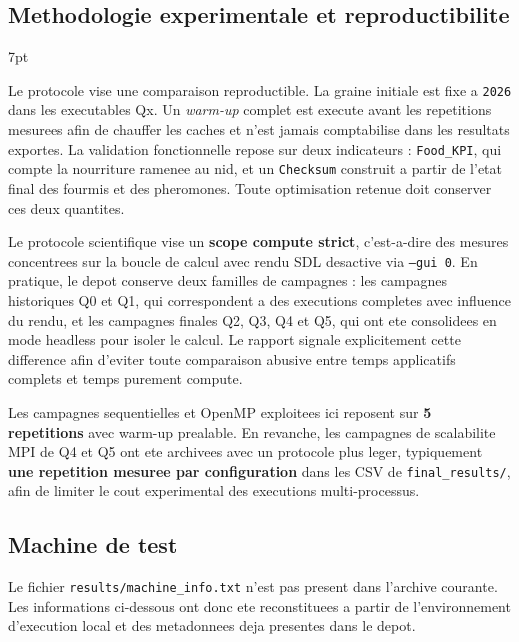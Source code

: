 \documentclass[11pt,a4paper]{article}
\newenvironment{formal}{%
\def\FrameCommand{%
  \hspace{1pt}%
  {\color{enstaBleuFonce}\vrule width 2pt}%
  {\color{formalshade}\vrule width 4pt}%
  \colorbox{formalshade}%
}%
\MakeFramed{\advance\hsize-\width\FrameRestore}%
\noindent\hspace{-4.55pt}%
\begin{adjustwidth}{}{7pt}%
\vspace{4pt}%
}{%
\vspace{4pt}\end{adjustwidth}\endMakeFramed%
}
\begin{document}
\subsection{Methodologie experimentale et reproductibilite}

\begin{formal}
Le protocole vise une comparaison reproductible. La graine initiale est fixe a \texttt{2026} dans les executables Qx. Un \emph{warm-up} complet est execute avant les repetitions mesurees afin de chauffer les caches et n'est jamais comptabilise dans les resultats exportes. La validation fonctionnelle repose sur deux indicateurs : \texttt{Food\_KPI}, qui compte la nourriture ramenee au nid, et un \texttt{Checksum} construit a partir de l'etat final des fourmis et des pheromones. Toute optimisation retenue doit conserver ces deux quantites.
\end{formal}

Le protocole scientifique vise un \textbf{scope compute strict}, c'est-a-dire des mesures concentrees sur la boucle de calcul avec rendu SDL desactive via \texttt{--gui 0}. En pratique, le depot conserve deux familles de campagnes : les campagnes historiques Q0 et Q1, qui correspondent a des executions completes avec influence du rendu, et les campagnes finales Q2, Q3, Q4 et Q5, qui ont ete consolidees en mode headless pour isoler le calcul. Le rapport signale explicitement cette difference afin d'eviter toute comparaison abusive entre temps applicatifs complets et temps purement compute.

Les campagnes sequentielles et OpenMP exploitees ici reposent sur \textbf{5 repetitions} avec warm-up prealable. En revanche, les campagnes de scalabilite MPI de Q4 et Q5 ont ete archivees avec un protocole plus leger, typiquement \textbf{une repetition mesuree par configuration} dans les CSV de \texttt{final\_results/}, afin de limiter le cout experimental des executions multi-processus.

\subsection{Machine de test}

Le fichier \texttt{results/machine\_info.txt} n'est pas present dans l'archive courante. Les informations ci-dessous ont donc ete reconstituees a partir de l'environnement d'execution local et des metadonnees deja presentes dans le depot.
\end{document}
